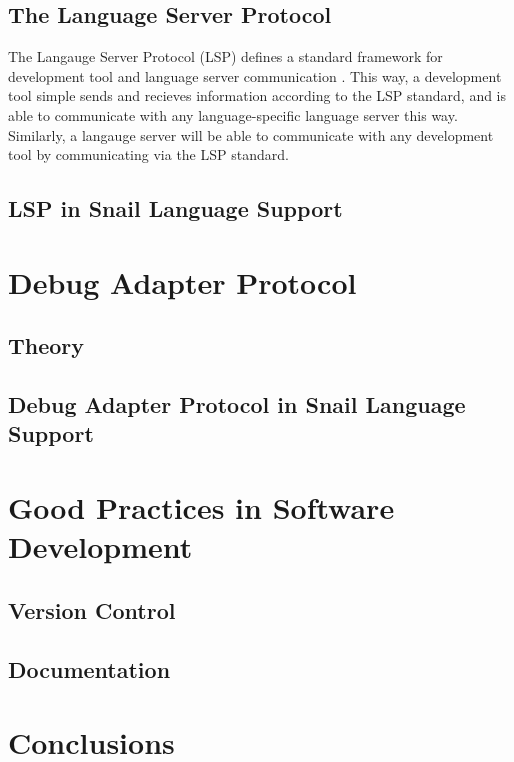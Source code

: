 \documentclass{article}
\begin{document}
\subsection{The Language Server Protocol} 

The Langauge Server Protocol (LSP) defines a standard framework for development tool and language server communication \cite{Microsoft_2022a}. This way, a development tool simple sends and recieves information according to the LSP standard, and is able to communicate with any language-specific language server this way. Similarly, a langauge server will be able to communicate with any development tool by communicating via the LSP standard. 

\subsection{LSP in Snail Language Support}

\section{Debug Adapter Protocol}

\subsection{Theory}

\subsection{Debug Adapter Protocol in Snail Language Support}

\section{Good Practices in Software Development}

\subsection{Version Control}

\subsection{Documentation}

\section{Conclusions}
\end{document}
